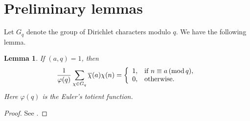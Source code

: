 \documentclass[12pt]{amsart}
\numberwithin{equation}{section}
\theoremstyle{plain}
\newtheorem{lem}{Lemma}
\theoremstyle{remark}
\theoremstyle{definition}
\theoremstyle{remark}
\renewcommand{\mod}[1]{\,({\rm mod}\,#1)}
\begin{document}
\section{Preliminary lemmas}
Let $G_q$ denote the group of Dirichlet characters modulo $q$. We have the following lemma.
\begin{lem}\label{orthogonality}
If $(a,q)=1$, then
\begin{equation*}
\begin{aligned}
\frac{1}{\varphi(q)}\sum_{\chi\in G_q}\overline{\chi}(a)\chi(n)=\left\{
                                                           \begin{array}{ll}
                                                             1, & \hbox{if $n\equiv a \mod q, $} \\
                                                             0, & \hbox{otherwise.}
                                                           \end{array}
                                                         \right.
\end{aligned}
\end{equation*}
Here $\varphi(q)$ is the Euler's totient function.
\end{lem}
\begin{proof}
See \cite[Section 4, (4)]{Davenport}.
\end{proof}
\end{document}

